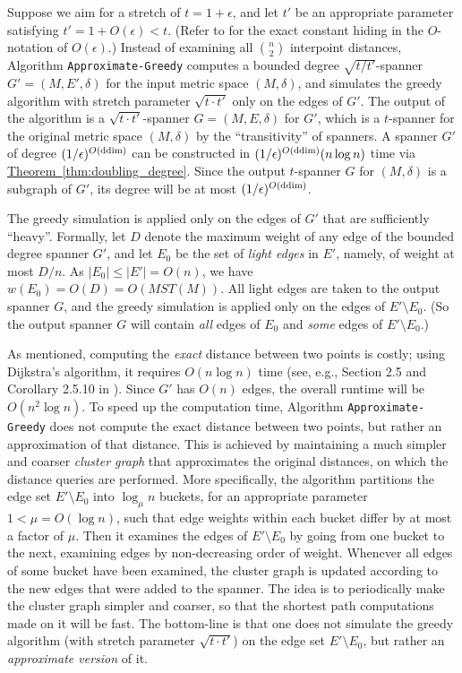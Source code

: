 \documentclass[11pt,letterpaper]{article}
\newcommand{\ddim}{{\rm ddim}}
\newcommand{\eps}{\epsilon}
\newcommand{\namedref}[2]{\hyperref[#2]{#1~\ref*{#2}}}
\newcommand{\theoremref}[1]{\namedref{Theorem}{#1}}
\begin{document}
Suppose we aim for a stretch of $t = 1+\eps$, and let $t'$ be an appropriate parameter satisfying $t' = 1 + O(\eps) < t$.
(Refer to \cite{GLN02,NS07} for the exact constant hiding in the $O$-notation of $O(\eps)$.)
Instead of examining all ${n \choose 2}$ interpoint distances, Algorithm \texttt{Approximate-Greedy} computes a
bounded degree $\sqrt{t/t'}$-spanner $G' = (M,E',\delta)$ for the input metric space $(M,\delta)$,
and simulates the greedy algorithm with stretch parameter $\sqrt{t \cdot t'}$ only on the edges of $G'$.
The output of the algorithm is a $\sqrt{t \cdot t'}$-spanner $G = (M,E,\delta)$ for $G'$,
which is a $t$-spanner for the original metric space $(M,\delta)$ by the ``transitivity'' of spanners.
A spanner $G'$ of degree $(1/\eps)^{O(\ddim)}$ can be constructed in $(1/\eps)^{O(\ddim)} (n \log n)$ time via \theoremref{thm:doubling_degree}.
Since the output $t$-spanner $G$ for $(M,\delta)$ is a subgraph of $G'$, its degree will be at most $(1/\eps)^{O(\ddim)}$.

The greedy simulation is applied only on the edges of $G'$ that are sufficiently ``heavy''.
Formally, let $D$ denote the maximum weight of any edge of the bounded degree spanner $G'$, and let $E_0$ be the set of \emph{light edges} in $E'$, namely, of weight at most $D/n$.
As $|E_0| \le |E'| = O(n)$, we have $w(E_0) = O(D) = O(MST(M))$.
All light edges are taken to the output spanner $G$, and the greedy simulation is applied only on the edges of $E' \setminus E_0$.
(So the output spanner $G$ will contain \emph{all} edges of $E_0$ and \emph{some} edges of $E' \setminus E_0$.)

As mentioned, computing the \emph{exact} distance between two points is costly;
using Dijkstra's algorithm, it requires $O(n \log n)$ time (see, e.g., Section 2.5 and Corollary 2.5.10 in \cite{NS07}).
Since $G'$ has $O(n)$ edges, the overall runtime will be $O(n^2 \log n)$.
To speed up the computation time, Algorithm \texttt{Approximate-Greedy} does not compute the exact distance between two points, but rather an approximation of that distance.
This is achieved by maintaining a much simpler and coarser \emph{cluster graph} that approximates the original distances, on which the distance queries are performed.
More specifically, the algorithm partitions the edge set $E' \setminus E_0$ into $\log_\mu n$ buckets,  for an appropriate parameter $1 < \mu = O(\log n)$,
such that edge weights within each bucket differ by at most a factor of $\mu$.
Then it examines the edges of $E' \setminus E_0$ by going from one bucket to the next, examining edges by non-decreasing order of weight.
Whenever all edges of some bucket have been examined, the cluster graph is updated according to the new edges that were added to the spanner.
The idea is to periodically make the cluster graph simpler and coarser, so that the shortest path computations made on it will be fast.
The bottom-line is that one does not simulate the greedy algorithm (with stretch parameter $\sqrt{t \cdot t'}$) on the edge set $E' \setminus E_0$, but rather an \emph{approximate version} of it.
\end{document}

